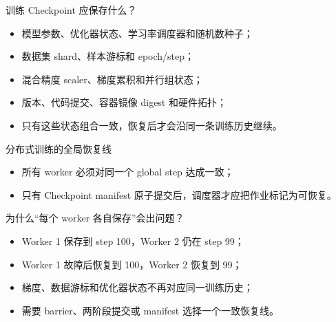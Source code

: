 \documentclass[UTF8,fontset=none,aspectratio=169,10pt]{beamer}
\begin{document}

\begin{frame}{训练 Checkpoint 应保存什么？}
\begin{itemize}
  \item 模型参数、优化器状态、学习率调度器和随机数种子；
  \item 数据集 shard、样本游标和 epoch/step；
  \item 混合精度 scaler、梯度累积和并行组状态；
  \item 版本、代码提交、容器镜像 digest 和硬件拓扑；
  \item 只有这些状态组合一致，恢复后才会沿同一条训练历史继续。
\end{itemize}
\end{frame}

\begin{frame}{分布式训练的全局恢复线}
\begin{center}
\end{center}
\begin{itemize}
  \item 所有 worker 必须对同一个 global step 达成一致；
  \item 只有 Checkpoint manifest 原子提交后，调度器才应把作业标记为可恢复。
\end{itemize}
\end{frame}

\begin{frame}{为什么“每个 worker 各自保存”会出问题？}
\begin{itemize}
  \item Worker 1 保存到 step 100，Worker 2 仍在 step 99；
  \item Worker 1 故障后恢复到 100，Worker 2 恢复到 99；
  \item 梯度、数据游标和优化器状态不再对应同一训练历史；
  \item 需要 barrier、两阶段提交或 manifest 选择一个一致恢复线。
\end{itemize}
\end{frame}
\end{document}
